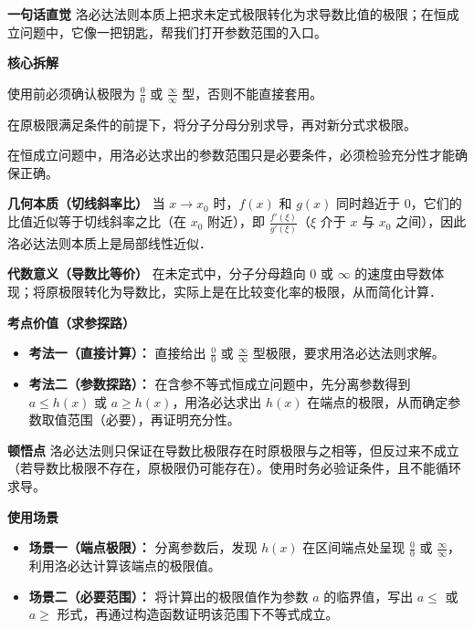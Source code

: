 \begin{explanationbox}
	\textbf{\textcolor{CExplanation}{一句话直觉}}
	洛必达法则本质上把求未定式极限转化为求导数比值的极限；在恒成立问题中，它像一把钥匙，帮我们打开参数范围的入口。

	\medskip
	\textbf{\textcolor{CExplanation}{核心拆解}}
	\begin{description}[style=nextline, leftmargin=2.8em, labelsep=0.5em, itemsep=0.45em]
		\item[\textbf{要点一（未定式判定）：}]
			使用前必须确认极限为 $\frac{0}{0}$ 或 $\frac{\infty}{\infty}$ 型，否则不能直接套用。
		\item[\textbf{要点二（求导替换）：}]
			在原极限满足条件的前提下，将分子分母分别求导，再对新分式求极限。
		\item[\textbf{要点三（必要性思想）：}]
			在恒成立问题中，用洛必达求出的参数范围只是必要条件，必须检验充分性才能确保正确。
	\end{description}

	\medskip
	\textbf{\textcolor{CExplanation}{几何本质（切线斜率比）}}
	当 $x\to x_0$ 时，$f(x)$ 和 $g(x)$ 同时趋近于 $0$，它们的比值近似等于切线斜率之比（在 $x_0$ 附近），即 $\frac{f'(\xi)}{g'(\xi)}$（$\xi$ 介于 $x$ 与 $x_0$ 之间），因此洛必达法则本质上是局部线性近似．

	\medskip
	\textbf{\textcolor{CExplanation}{代数意义（导数比等价）}}
	在未定式中，分子分母趋向 $0$ 或 $\infty$ 的速度由导数体现；将原极限转化为导数比，实际上是在比较变化率的极限，从而简化计算．

	\medskip
	\textbf{\textcolor{CExplanation}{考点价值（求参探路）}}
	\begin{itemize}[leftmargin=*, itemsep=0.5em, topsep=0.4em]
		\item \textbf{考法一（直接计算）：} 直接给出 $\frac{0}{0}$ 或 $\frac{\infty}{\infty}$ 型极限，要求用洛必达法则求解。
		\item \textbf{考法二（参数探路）：} 在含参不等式恒成立问题中，先分离参数得到 $a\le h(x)$ 或 $a\ge h(x)$，用洛必达求出 $h(x)$ 在端点的极限，从而确定参数取值范围（必要），再证明充分性。
	\end{itemize}

	\medskip
	\textbf{\textcolor{CExplanation}{顿悟点}}
	洛必达法则只保证在导数比极限存在时原极限与之相等，但反过来不成立（若导数比极限不存在，原极限仍可能存在）。使用时务必验证条件，且不能循环求导。

	\medskip
	\textbf{\textcolor{CExplanation}{使用场景}}
	\begin{itemize}[leftmargin=*, itemsep=0.5em, topsep=0.4em]
		\item \textbf{场景一（端点极限）：} 分离参数后，发现 $h(x)$ 在区间端点处呈现 $\frac{0}{0}$ 或 $\frac{\infty}{\infty}$，利用洛必达计算该端点的极限值。
		\item \textbf{场景二（必要范围）：} 将计算出的极限值作为参数 $a$ 的临界值，写出 $a\le$ 或 $a\ge$ 形式，再通过构造函数证明该范围下不等式成立。
	\end{itemize}

\end{explanationbox}
